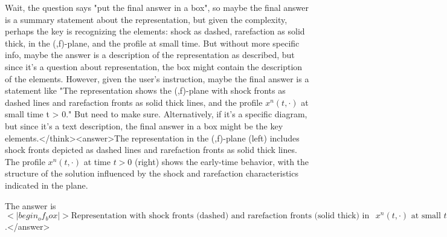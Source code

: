 Wait, the question says "put the final answer in a box", so maybe the final answer is a summary statement about the representation, but given the complexity, perhaps the key is recognizing the elements: shock as dashed, rarefaction as solid thick, in the (,f)-plane, and the profile at small time. But without more specific info, maybe the answer is a description of the representation as described, but since it's a question about representation, the box might contain the description of the elements. However, given the user's instruction, maybe the final answer is a statement like "The representation shows the (,f)-plane with shock fronts as dashed lines and rarefaction fronts as solid thick lines, and the profile \( x^n(t, \cdot) \) at small time t > 0." But need to make sure. Alternatively, if it's a specific diagram, but since it's a text description, the final answer in a box might be the key elements.</think><answer>The representation in the (,f)-plane (left) includes shock fronts depicted as dashed lines and rarefaction fronts as solid thick lines. The profile \( x^n(t, \cdot) \) at time \( t > 0 \) (right) shows the early-time behavior, with the structure of the solution influenced by the shock and rarefaction characteristics indicated in the plane.  

The answer is \(<|begin_of_box|>\text{Representation with shock fronts (dashed) and rarefaction fronts (solid thick) in the (,f)-plane, and profile } x^n(t, \cdot) \text{ at small } t > 0<|end_of_box|>\).</answer>